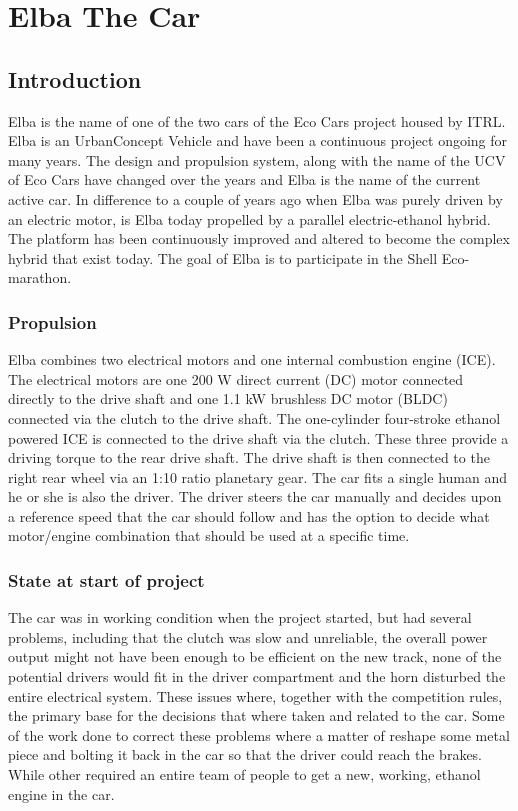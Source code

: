 \chapter{Elba The Car}

\section{Introduction}
Elba is the name of one of the two cars of the Eco Cars project housed by
ITRL\@.  Elba is an UrbanConcept Vehicle and have been a continuous
project ongoing for many years. The design and propulsion system, along with the
name of the UCV of Eco Cars have changed over the years and Elba is the name of
the current active car. In difference to a couple of years ago when Elba was
purely driven by an electric motor, is Elba today propelled by a parallel
electric-ethanol hybrid. The platform has been continuously improved and altered
to become the complex hybrid that exist today. The goal of Elba is to
participate in the Shell Eco-marathon.

\subsection{Propulsion}
Elba combines two electrical
motors and one internal combustion engine (ICE). The electrical motors are one
200 W direct current (DC) motor connected directly to the drive shaft and one
1.1 kW brushless DC motor (BLDC) connected via the clutch to the drive shaft.
The one-cylinder four-stroke ethanol powered ICE is connected to the drive
shaft via the clutch. These three provide a driving torque to the rear drive
shaft. The drive shaft is then connected to the right rear wheel via an 1:10
ratio planetary gear. The car fits a single human and he or she is also the
driver. The driver steers the car manually and decides upon a reference speed
that the car should follow and has the option to decide what motor/engine
combination that should be used at a specific time.

\subsection{State at start of project}
The car was in working condition when the project started, but had several
problems, including that the clutch was slow and unreliable, the overall power
output might not have been enough to be efficient on the new track, none of the
potential drivers would fit in the driver compartment and the horn disturbed the
entire electrical system.  These issues where, together with the competition
rules, the primary base for the decisions that where taken and related to the
car. Some of the work done to correct these problems where a matter of reshape
some metal piece and bolting it back in the car so that the driver could reach
the brakes. While other required an entire team of people to get a new, working,
ethanol engine in the car.

